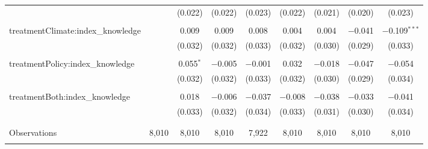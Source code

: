 \begin{tabular}{@{\extracolsep{5pt}}lcccccccc}
  &  & (0.022) & (0.022) & (0.023) & (0.022) & (0.021) & (0.020) & (0.023) \\ 
  & & & & & & & & \\ 
 treatmentClimate:index\_knowledge &  & 0.009 & 0.009 & 0.008 & 0.004 & 0.004 & $-$0.041 & $-$0.109$^{***}$ \\ 
  &  & (0.032) & (0.032) & (0.033) & (0.032) & (0.030) & (0.029) & (0.033) \\ 
  & & & & & & & & \\ 
 treatmentPolicy:index\_knowledge &  & 0.055$^{*}$ & $-$0.005 & $-$0.001 & 0.032 & $-$0.018 & $-$0.047 & $-$0.054 \\ 
  &  & (0.032) & (0.032) & (0.033) & (0.032) & (0.030) & (0.029) & (0.034) \\ 
  & & & & & & & & \\ 
 treatmentBoth:index\_knowledge &  & 0.018 & $-$0.006 & $-$0.037 & $-$0.008 & $-$0.038 & $-$0.033 & $-$0.041 \\ 
  &  & (0.033) & (0.032) & (0.034) & (0.033) & (0.031) & (0.030) & (0.034) \\ 
  & & & & & & & & \\ 
\hline \\[-1.8ex] 

Observations & 8,010 & 8,010 & 8,010 & 7,922 & 8,010 & 8,010 & 8,010 & 8,010 \\ 
\hline 
\hline \\[-1.8ex] 
\end{tabular} 